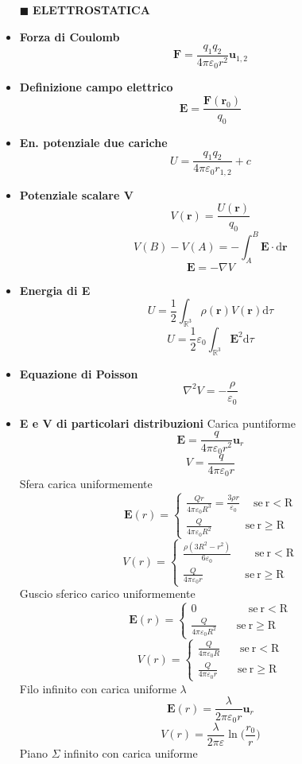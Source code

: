\documentclass{book}
\newcommand{\g}{\textbf}
\newcommand{\h}{\mathbf}
\newcommand{\e}{\begin{equation}}
\newcommand{\ex}{\end{equation} }
\renewcommand{\it}{\item[$\cdot$]}
\begin{document}
\begin{multicols}{4}
\begin{itemize}
\hline
\item [$\blacksquare$] \g{ELETTROSTATICA}
    \it \g{Forza di Coulomb}
        \e{\h{F}=\frac{q_1 q_2}{4\pi\varepsilon_0 r^2}\h{u}_{1,2}} \ex
    \it \g{Definizione campo elettrico}
        \e{\h{E}=\frac{\h{F}(\h{r}_0)}{q_0}} \ex
    \it \g{En. potenziale due cariche}
        \e{U=\frac{q_1q_2}{4\pi\varepsilon_0r_{1,2}}+c} \ex
    \it \g{Potenziale scalare V}
        \e{V(\h{r})=\frac{U(\h{r})}{q_0}} \ex
        \e{V(B)-V(A)=-\int_A^B\h{E}\cdot \mathrm{d} \h{r}} \ex
        \e{\h{E}=-\nabla V} \ex
    \it \g{Energia di E}
        \e{U=\frac{1}{2} \int_{\mathbb{R}^3} \rho(\h{r}) V(\h{r}) \mathrm{d}\tau} \ex
        \e{U=\frac{1}{2}\varepsilon_0\int_{\mathbb{R}^3}\h{E}^2 \mathrm{d}\tau} \ex
    \it \g{Equazione di Poisson}
        \e{\nabla^2V=-\frac{\rho}{\varepsilon_0}} \ex
    \it \g{E e V di particolari distribuzioni}
    Carica puntiforme 
        \e{\h{E}=\frac{q}{4\pi\varepsilon_0 r^2}\h{u}_{r}} \ex
        \e{V=\frac{q}{4\pi\varepsilon_0 r}} \ex
    Sfera carica uniformemente
        \e{ \h{E}(r)=\begin{cases} 
        \frac{Qr}{4\pi\varepsilon_0 R^3}=\frac{3 \rho r}{\varepsilon_0} \quad \mathrm{\ se\ r<R}\\
        \frac{Q}{4\pi\varepsilon_0 R^2} \quad \ \ \ \ \ \ \ \ \mathrm{\ se\ r\geq R}\end{cases} } \ex
        \e{ V(r)=\begin{cases} 
        \frac{\rho (3R^2-r^2)}{6\varepsilon_0 } \quad \ \ \ \ \mathrm{\ se\ r<R}\\
        \frac{Q}{4\pi\varepsilon_0 r} \qquad \ \ \ \ \ \ \ \mathrm{\ se\ r\geq R}\end{cases} } \ex
    Guscio sferico carico uniformemente
        \e{ \h{E}(r)=\begin{cases} 
        0 \qquad \qquad \ \ \mathrm{\ se\ r<R}\\
        \frac{Q}{4\pi\varepsilon_0 R^2} \ \ \ \ \ \ \ \mathrm{\ se\ r\geq R}\end{cases} } \ex
        \e{ V(r)=\begin{cases} 
        \frac{Q}{4\pi\varepsilon_0 R} \ \ \ \ \ \ \ \mathrm{\ se\ r<R}\\
        \frac{Q}{4\pi\varepsilon_0 r} \ \ \ \ \ \ \ \mathrm{\ se\ r\geq R}\end{cases} } \ex
    Filo infinito con carica uniforme $\lambda$
        \e{\h{E}(r)=\frac{\lambda}{2\pi\varepsilon_0 r} \h{u}_r} \ex
        \e{V(r)=\frac{\lambda}{2\pi\varepsilon} \ln \biggl(\frac{r_0}{r}\biggr)} \ex
    Piano $\Sigma$ infinito con carica uniforme

\end{itemize}
\end{multicols}
\end{document}
